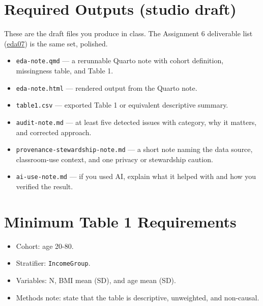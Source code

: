 \documentclass[
  letterpaper,
  DIV=11,
  numbers=noendperiod,
  oneside]{scrreprt}
\providecommand{\tightlist}{%
  \setlength{\itemsep}{0pt}\setlength{\parskip}{0pt}}
\begin{document}
\section*{Required Outputs (studio
draft)}\label{required-outputs-studio-draft-1}


These are the draft files you produce in class. The Assignment 6
deliverable list (\href{eda07-assignment-a6-and-reference.qmd}{eda07})
is the same set, polished.

\begin{itemize}
\tightlist
\item
  \texttt{eda-note.qmd} --- a rerunnable Quarto note with cohort
  definition, missingness table, and Table 1.
\item
  \texttt{eda-note.html} --- rendered output from the Quarto note.
\item
  \texttt{table1.csv} --- exported Table 1 or equivalent descriptive
  summary.
\item
  \texttt{audit-note.md} --- at least five detected issues with
  category, why it matters, and corrected approach.
\item
  \texttt{provenance-stewardship-note.md} --- a short note naming the
  data source, classroom-use context, and one privacy or stewardship
  caution.
\item
  \texttt{ai-use-note.md} --- if you used AI, explain what it helped
  with and how you verified the result.
\end{itemize}

\section*{Minimum Table 1
Requirements}\label{minimum-table-1-requirements}


\begin{itemize}
\tightlist
\item
  Cohort: age 20-80.
\item
  Stratifier: \texttt{IncomeGroup}.
\item
  Variables: N, BMI mean (SD), and age mean (SD).
\item
  Methods note: state that the table is descriptive, unweighted, and
  non-causal.
\end{itemize}
\end{document}
